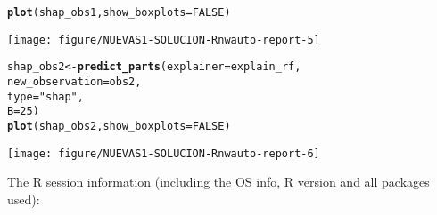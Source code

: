 \documentclass{article}\usepackage[]{graphicx}\usepackage[]{xcolor}
\makeatletter
\newcommand{\hlnum}[1]{\textcolor[rgb]{0.686,0.059,0.569}{#1}}%
\newcommand{\hlstr}[1]{\textcolor[rgb]{0.192,0.494,0.8}{#1}}%
\newcommand{\hlstd}[1]{\textcolor[rgb]{0.345,0.345,0.345}{#1}}%
\newcommand{\hlkwb}[1]{\textcolor[rgb]{0.69,0.353,0.396}{#1}}%
\newcommand{\hlkwc}[1]{\textcolor[rgb]{0.333,0.667,0.333}{#1}}%
\newcommand{\hlkwd}[1]{\textcolor[rgb]{0.737,0.353,0.396}{\textbf{#1}}}%
\newenvironment{kframe}{%
 \def\at@end@of@kframe{}%
 \ifinner\ifhmode%
  \def\at@end@of@kframe{\end{minipage}}%
  \begin{minipage}{\columnwidth}%
 \fi\fi%
 \def\FrameCommand##1{\hskip\@totalleftmargin \hskip-\fboxsep
 \colorbox{shadecolor}{##1}\hskip-\fboxsep
     \hskip-\linewidth \hskip-\@totalleftmargin \hskip\columnwidth}%
 \MakeFramed {\advance\hsize-\width
   \@totalleftmargin\z@ \linewidth\hsize
   \@setminipage}}%
 {\par\unskip\endMakeFramed%
 \at@end@of@kframe}
\newenvironment{knitrout}{}{} %
\makeatother
\begin{document}
\begin{knitrout}
\begin{kframe}
\begin{alltt}
\hlkwd{plot}\hlstd{(shap_obs1,} \hlkwc{show_boxplots} \hlstd{=} \hlnum{FALSE}\hlstd{)}
\end{alltt}
\end{kframe}

{\centering \texttt{[image: figure/NUEVAS1-SOLUCION-Rnwauto-report-5]} 

}


\begin{kframe}\begin{alltt}
\hlstd{shap_obs2} \hlkwb{<-} \hlkwd{predict_parts}\hlstd{(}\hlkwc{explainer} \hlstd{= explain_rf,}
                            \hlkwc{new_observation} \hlstd{= obs2,}
                            \hlkwc{type} \hlstd{=} \hlstr{"shap"}\hlstd{,}
                            \hlkwc{B} \hlstd{=} \hlnum{25}\hlstd{)}
\hlkwd{plot}\hlstd{(shap_obs2,} \hlkwc{show_boxplots} \hlstd{=} \hlnum{FALSE}\hlstd{)}
\end{alltt}
\end{kframe}

{\centering \texttt{[image: figure/NUEVAS1-SOLUCION-Rnwauto-report-6]} 

}


\end{knitrout}

The R session information (including the OS info, R version and all
packages used):
\end{document}
